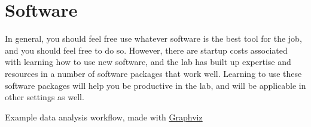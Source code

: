 \documentclass{tufte-book}
\begin{document}
\section{Software}

In general, you should feel free use whatever software is the best
tool for the job, and you should feel free to do so. However, there are
startup costs associated with learning how to use new software, and
the lab has built up expertise and resources in a number of software
packages that work well. Learning to use these software packages will
help you be productive in the lab, and will be applicable in other
settings as well.

\begin{marginfigure}
\caption{Example data analysis workflow, made with \href{www.graphviz.org}{Graphviz}}
\label{fig:analysis-schematic}
\end{marginfigure}
\end{document}
